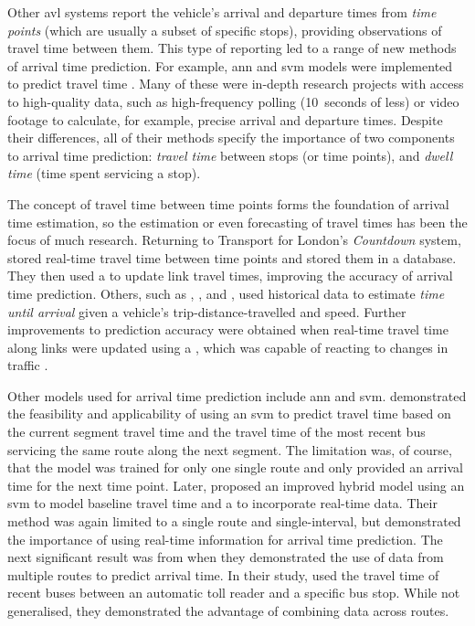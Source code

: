 Other \gls{avl} systems report the vehicle's arrival and departure times from \emph{time points} (which are usually a subset of specific stops), providing observations of travel time between them. This type of reporting led to a range of new methods of arrival time prediction. For example, \gls{ann} and \gls{svm} models were implemented to predict travel time \citep{Jeong_2005,Shalaby_2004,Yu_2011,Cats_2015,Cats_2016,Yin_2017}. Many of these were in-depth research projects with access to high-quality data, such as high-frequency polling (10~seconds of less) or video footage to calculate, for example, precise arrival and departure times. Despite their differences, all of their methods specify the importance of two components to arrival time prediction: \emph{travel time} between stops (or time points), and \emph{dwell time} (time spent servicing a stop).


The concept of travel time between time points forms the foundation of arrival time estimation, so the estimation or even forecasting of travel times has been the focus of much research. Returning to Transport for London's \emph{Countdown} system, \citet{Reinhoudt_1997} stored real-time travel time between time points and stored them in a database. They then used a \kf{} to update link travel times, improving the accuracy of arrival time prediction. Others, such as \citet{Wall_1999}, \citet{Dailey_2001}, and \citet{Cathey_2003}, used historical data to estimate \emph{time until arrival} given a vehicle's trip-distance-travelled and speed. Further improvements to prediction accuracy were obtained when real-time travel time along links were updated using a \kf{}, which was capable of reacting to changes in traffic \citep{Shalaby_2004}.


Other models used for arrival time prediction include \gls{ann} and \gls{svm}.  demonstrated the feasibility and applicability of using an \gls{svm} to predict travel time based on the current segment travel time and the travel time of the most recent bus servicing the same route along the next segment. The limitation was, of course, that the model was trained for only one single route and only provided an arrival time for the next time point. Later, \citet{Yu_2010} proposed an improved hybrid model using an \gls{svm} to model baseline travel time and a \kf{} to incorporate real-time data. Their method was again limited to a single route and single-interval, but demonstrated the importance of using real-time information for arrival time prediction. The next significant result was from \citet{Yu_2011} when they demonstrated the use of data from multiple routes to predict arrival time. In their study, \citeauthor{Yu_2011} used the travel time of recent buses between an automatic toll reader and a specific bus stop. While not generalised, they demonstrated the advantage of combining data across routes.


